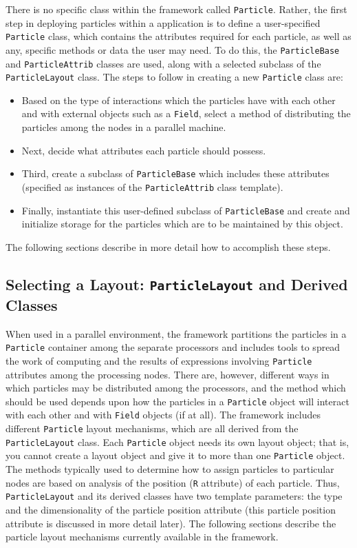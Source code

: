 There is no specific class within the \ippl framework called \texttt{Particle}. Rather, the first step in deploying particles within a \ippl application is to define a user-specified \texttt{Particle} class, which contains the attributes required for each particle, as well as any, specific methods or data the user may need. To do this, the \texttt{ParticleBase} and \texttt{ParticleAttrib} classes are used, along with a selected subclass of the \texttt{ParticleLayout} class. The steps to follow in creating a new \texttt{Particle} class are:
\begin{itemize}
    \item Based on the type of interactions which the particles have with each other and with external objects such as a \texttt{Field}, select a method of distributing the particles among the nodes in a parallel machine.
    \item Next, decide what attributes each particle should possess.
    \item Third, create a subclass of \texttt{ParticleBase} which includes these attributes (specified as instances of the \texttt{ParticleAttrib} class template).
    \item Finally, instantiate this user-defined subclass of \texttt{ParticleBase} and create and initialize storage for the particles which are to be maintained by this object. 
\end{itemize}

The following sections describe in more detail how to accomplish these steps.

\subsection{Selecting a Layout: \texttt{ParticleLayout} and Derived Classes}

When used in a parallel environment, the \ippl framework partitions the particles in a \texttt{Particle} container among the separate processors and includes tools to spread the work of computing and the results of expressions involving \texttt{Particle} attributes among the processing nodes. There are, however, different ways in which particles may be distributed among the processors, and the method which should be used depends upon how the particles in a \texttt{Particle}
object will interact with each other and with \texttt{Field} objects (if at all). The \ippl framework includes different \texttt{Particle} layout mechanisms, which are all derived from the \texttt{ParticleLayout} class. Each \texttt{Particle} object needs its own layout object; that is, you cannot create a layout object and give it to more than one \texttt{Particle} object. The methods typically used to determine how to assign particles to particular nodes are based on analysis of the
position (\texttt{R} attribute) of each particle. Thus, \texttt{ParticleLayout} and its derived classes have two template parameters: the type and the dimensionality of the particle position attribute (this particle position attribute is discussed in more detail later). The following sections describe the particle layout mechanisms currently available in the \ippl framework.

